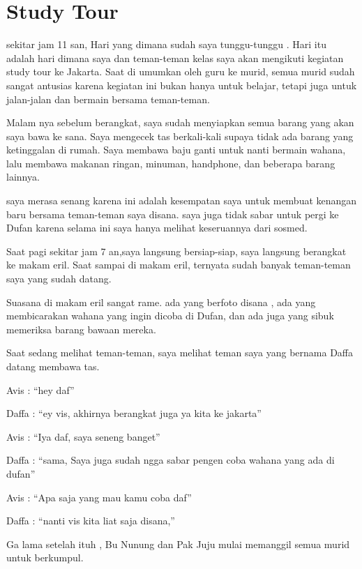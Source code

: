 \chapter*{Study Tour}

 sekitar jam 11 san, Hari yang dimana sudah saya tunggu-tunggu . Hari itu adalah hari dimana saya dan teman-teman kelas saya akan mengikuti kegiatan study tour ke Jakarta. Saat di umumkan oleh guru ke murid, semua murid sudah sangat antusias karena kegiatan ini bukan hanya untuk belajar, tetapi juga untuk jalan-jalan dan bermain bersama teman-teman.


Malam nya sebelum berangkat, saya sudah menyiapkan semua barang yang akan saya bawa ke sana. Saya mengecek tas berkali-kali supaya tidak ada barang yang ketinggalan di rumah. Saya membawa baju ganti untuk nanti bermain wahana, lalu membawa makanan ringan, minuman, handphone, dan beberapa barang lainnya.


saya merasa senang karena ini adalah kesempatan saya untuk membuat kenangan baru bersama teman-teman saya disana. saya juga tidak sabar untuk pergi ke Dufan karena selama ini saya hanya melihat keseruannya dari sosmed.


Saat pagi sekitar jam 7 an,saya langsung bersiap-siap, saya langsung berangkat ke makam eril. Saat sampai di makam eril, ternyata sudah banyak teman-teman saya yang sudah datang.


Suasana di makam eril sangat rame. ada yang berfoto disana , ada yang membicarakan wahana yang ingin dicoba di Dufan, dan ada juga yang sibuk memeriksa barang bawaan mereka.


Saat sedang melihat teman-teman, saya melihat teman saya yang bernama Daffa datang membawa tas.


Avis : “hey daf”


Daffa : “ey vis, akhirnya berangkat juga ya kita ke jakarta”


Avis : “Iya daf, saya seneng banget”


Daffa : “sama, Saya juga sudah ngga sabar pengen coba wahana yang ada di dufan”


Avis : “Apa saja yang mau kamu coba daf”


Daffa : “nanti vis kita liat saja disana,”


Ga lama setelah ituh , Bu Nunung dan Pak Juju mulai memanggil semua murid untuk berkumpul.



